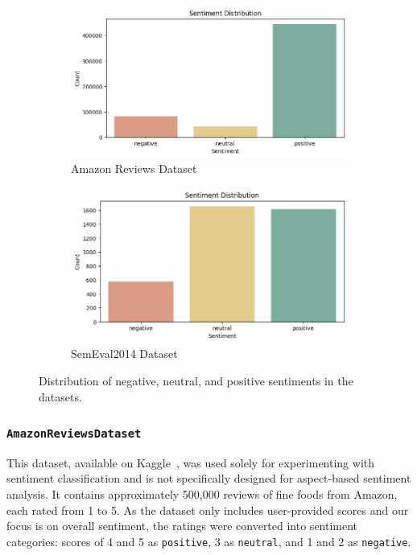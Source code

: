 \begin{figure}[h]
\centering
\begin{subfigure}{0.45\textwidth}
    \centering
    \includegraphics[width=\textwidth]{images/dist_amazon.png}
    \caption{Amazon Reviews Dataset}
    \label{fig:dist_amazon}
\end{subfigure}
\hfill
\begin{subfigure}{0.45\textwidth}
    \centering
    \includegraphics[width=\textwidth]{images/dist_semeval.png}
    \caption{SemEval2014 Dataset}
    \label{fig:dist_semeval}
\end{subfigure}
\caption{Distribution of negative, neutral, and positive sentiments in the datasets.}
\label{fig:sentiment_distributions}
\end{figure}

\subsubsection{\texttt{AmazonReviewsDataset}}

This dataset, available on Kaggle~\cite{amazon_dataset}, was used solely for experimenting with sentiment classification and is not specifically designed for aspect-based sentiment analysis. It contains approximately 500,000 reviews of fine foods from Amazon, each rated from 1 to 5. As the dataset only includes user-provided scores and our focus is on overall sentiment, the ratings were converted into sentiment categories: scores of 4 and 5 as \texttt{positive}, 3 as \texttt{neutral}, and 1 and 2 as \texttt{negative}.

